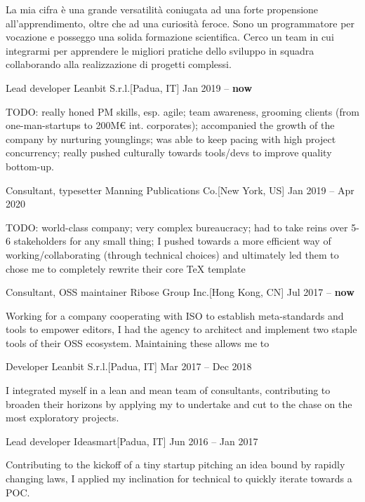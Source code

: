 \documentclass[9pt]{scrartcl}
\def\Phi{1.618}
\newlength{\Pad}\setlength{\Pad}{14.562pt} %
\begin{document}


La mia cifra è una grande versatilità coniugata ad una forte propensione
all'apprendimento, oltre che ad una curiosità feroce. Sono un programmatore per
vocazione e posseggo una solida formazione scientifica. Cerco un team in cui
integrarmi per apprendere le migliori pratiche dello sviluppo in squadra
collaborando alla realizzazione di progetti complessi.


\Event
  {Lead developer}
  {Leanbit S.r.l.}[Padua, IT]
  {Jan 2019 -- \textbf{now}}

TODO: really honed PM skills, esp. agile; team awareness, grooming clients (from
one-man-startups to 200M€ int. corporates); accompanied the growth of the
company by nurturing younglings; was able to keep pacing with high project
concurrency; really pushed culturally towards tools/devs to improve quality
bottom-up.

\Event
  {Consultant, typesetter}
  {Manning Publications Co.}[New York, US]
  {Jan 2019 -- Apr 2020}

TODO: world-class company; very complex bureaucracy; had to take reins over 5-6
stakeholders for any small thing; I pushed towards a more efficient way of
working/collaborating (through technical choices) and ultimately led them to
chose me to completely rewrite their core TeX template

\Event
  {Consultant, OSS maintainer}
  {Ribose Group Inc.}[Hong Kong, CN]
  {Jul 2017 -- \textbf{now}}

Working for a company cooperating with ISO to establish meta-standards and tools
to empower editors, I had the agency to architect and implement two staple
 tools of their OSS ecosystem. Maintaining these allows me to 

\Event
  {Developer}
  {Leanbit S.r.l.}[Padua, IT]
  {Mar 2017 -- Dec 2018}

I integrated myself in a lean and mean team of consultants, contributing to
broaden their horizons by applying my  to undertake and cut
to the chase on the most exploratory projects.

\Event
  {Lead developer}
  {Ideasmart}[Padua, IT]
  {Jun 2016 -- Jan 2017}

Contributing to the kickoff of a tiny startup pitching an idea bound by rapidly
changing laws, I applied my inclination for technical 
to quickly iterate towards a POC.
\end{document}

